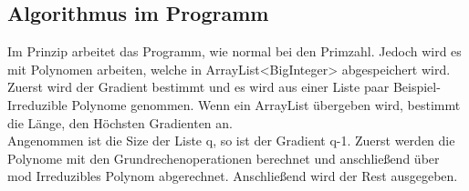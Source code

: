 \subsection*{Algorithmus im Programm}

Im Prinzip arbeitet das Programm, wie normal bei den Primzahl. Jedoch wird es mit Polynomen arbeiten, welche in ArrayList<BigInteger> abgespeichert wird.\\
Zuerst wird der Gradient bestimmt und es wird aus einer Liste paar Beispiel-Irreduzible Polynome genommen. Wenn ein ArrayList übergeben wird, bestimmt die Länge, den Höchsten Gradienten an.\\
Angenommen ist die Size der Liste q, so ist der Gradient q-1. Zuerst werden die Polynome mit den Grundrechenoperationen berechnet und anschließend über mod Irreduzibles Polynom abgerechnet. Anschließend wird der Rest ausgegeben.
\\

